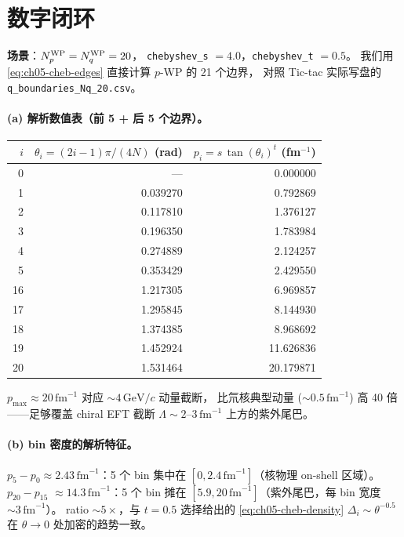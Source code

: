 \section{数字闭环}
\label{sec:ch05-numerics}

\begin{numericalbox}[label={box:ch05-numerical-closure}]
\textbf{场景}：\({N_{p}^{\text{WP}}} = {N_{q}^{\text{WP}}} = 20\)，
\texttt{chebyshev\_s} \(= 4.0\)，\texttt{chebyshev\_t} \(= 0.5\)。
我们用 \cref{eq:ch05-cheb-edges} 直接计算 \(p\)-WP 的 21 个边界，
对照 Tic-tac 实际写盘的 \texttt{q\_boundaries\_Nq\_20.csv}。

\paragraph{(a) 解析数值表（前 5 + 后 5 个边界）。}
\begin{center}
\begin{tabular}{rrr}
\toprule
\(i\) & \(\theta_i = (2i-1)\pi/(4N)\) (rad) & \(p_i = s\,\tan(\theta_i)^t\) (fm\(^{-1}\)) \\
\midrule
 0 & ---       &  0.000000 \\
 1 & 0.039270  &  0.792869 \\
 2 & 0.117810  &  1.376127 \\
 3 & 0.196350  &  1.783984 \\
 4 & 0.274889  &  2.124257 \\
 5 & 0.353429  &  2.429550 \\
\midrule
16 & 1.217305 &  6.969857 \\
17 & 1.295845 &  8.144930 \\
18 & 1.374385 &  8.968692 \\
19 & 1.452924 & 11.626836 \\
20 & 1.531464 & 20.179871 \\
\bottomrule
\end{tabular}
\end{center}
\(p_{\max} \approx 20\,\mathrm{fm}^{-1}\) 对应 \(\sim 4\,\mathrm{GeV}/c\) 动量截断，
比氘核典型动量 (\(\sim 0.5\,\mathrm{fm}^{-1}\)) 高 40 倍——足够覆盖
chiral EFT 截断 \(\Lambda \sim 2\)--\(3\,\mathrm{fm}^{-1}\) 上方的紫外尾巴。

\paragraph{(b) bin 密度的解析特征。}
\(p_5 - p_0 \approx 2.43\,\mathrm{fm}^{-1}\)：5 个 bin 集中在
\([0, 2.4\,\mathrm{fm}^{-1}]\)（核物理 on-shell 区域）。
\(p_{20} - p_{15}\) \(\approx 14.3\,\mathrm{fm}^{-1}\)：5 个 bin 摊在
\([5.9, 20\,\mathrm{fm}^{-1}]\)（紫外尾巴，每 bin 宽度 \(\sim 3\,\mathrm{fm}^{-1}\)）。
ratio \(\sim 5\times\)，与 \(t = 0.5\) 选择给出的 \cref{eq:ch05-cheb-density}
\(\Delta_i \sim \theta^{-0.5}\) 在 \(\theta \to 0\) 处加密的趋势一致。


\end{numericalbox}
